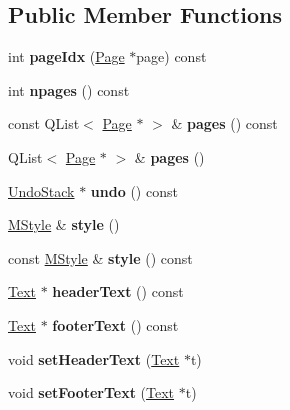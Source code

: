 \subsection*{Public Member Functions}
\begin{DoxyCompactItemize}
\item 
\mbox{\label{class_ms_1_1_movements_a327b778b33356c6eb425e1867bc7e394}} 
int {\bfseries page\+Idx} (\hyperlink{class_ms_1_1_page}{Page} $\ast$page) const
\item 
\mbox{\label{class_ms_1_1_movements_ad163c21003b19063136c34aae9a06c55}} 
int {\bfseries npages} () const
\item 
\mbox{\label{class_ms_1_1_movements_a9e72be6895078156428a05627d118291}} 
const Q\+List$<$ \hyperlink{class_ms_1_1_page}{Page} $\ast$ $>$ \& {\bfseries pages} () const
\item 
\mbox{\label{class_ms_1_1_movements_ac97f93b0ea204c49894a87a298adaeac}} 
Q\+List$<$ \hyperlink{class_ms_1_1_page}{Page} $\ast$ $>$ \& {\bfseries pages} ()
\item 
\mbox{\label{class_ms_1_1_movements_ad4c88a81182ff84f28b3207a3869c3b1}} 
\hyperlink{class_ms_1_1_undo_stack}{Undo\+Stack} $\ast$ {\bfseries undo} () const
\item 
\mbox{\label{class_ms_1_1_movements_a23e7a41b2b20fd81d524d87b1b6482c4}} 
\hyperlink{class_ms_1_1_m_style}{M\+Style} \& {\bfseries style} ()
\item 
\mbox{\label{class_ms_1_1_movements_a339ec092dfc80fdf5920c1627f131536}} 
const \hyperlink{class_ms_1_1_m_style}{M\+Style} \& {\bfseries style} () const
\item 
\mbox{\label{class_ms_1_1_movements_a84a1013fe534974f4ea55b6ce28e16d7}} 
\hyperlink{class_ms_1_1_text}{Text} $\ast$ {\bfseries header\+Text} () const
\item 
\mbox{\label{class_ms_1_1_movements_aece0aea11caac539773553e3d09630ba}} 
\hyperlink{class_ms_1_1_text}{Text} $\ast$ {\bfseries footer\+Text} () const
\item 
\mbox{\label{class_ms_1_1_movements_a9b8519748eded3e4a3ff54a7553a52c9}} 
void {\bfseries set\+Header\+Text} (\hyperlink{class_ms_1_1_text}{Text} $\ast$t)
\item 
\mbox{\label{class_ms_1_1_movements_a208d9093f164275a7bb104605d36ca84}} 
void {\bfseries set\+Footer\+Text} (\hyperlink{class_ms_1_1_text}{Text} $\ast$t)
\end{DoxyCompactItemize}


